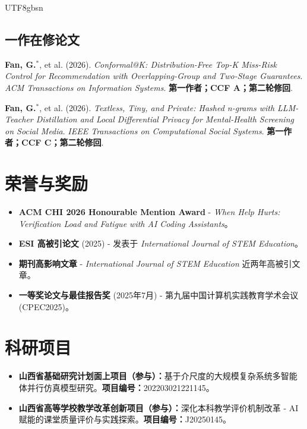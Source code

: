 \documentclass[a4paper,10pt]{article}
\newcommand{\cvlabel}[1]{\textbf{#1}}
\newcommand{\pubitem}[1]{\item #1}
\begin{document}
\begin{CJK*}{UTF8}{gbsn}
\subsection*{一作在修论文}
\begin{enumerate}[label=\textbf{[R\arabic*]}]
  \pubitem{\textbf{Fan, G.}$^{*}$, et al. (2026). \textit{Conformal@K: Distribution-Free Top-K Miss-Risk Control for Recommendation with Overlapping-Group and Two-Stage Guarantees}. \textit{ACM Transactions on Information Systems}. \textbf{第一作者；CCF A；第二轮修回}. }

  \pubitem{\textbf{Fan, G.}$^{*}$, et al. (2026). \textit{Textless, Tiny, and Private: Hashed n-grams with LLM-Teacher Distillation and Local Differential Privacy for Mental-Health Screening on Social Media}. \textit{IEEE Transactions on Computational Social Systems}. \textbf{第一作者；CCF C；第二轮修回}. }
\end{enumerate}

\section*{荣誉与奖励}
\begin{itemize}
  \item \textbf{ACM CHI 2026 Honourable Mention Award} - \textit{When Help Hurts: Verification Load and Fatigue with AI Coding Assistants}。
  \item \textbf{ESI 高被引论文} (2025) - 发表于 \textit{International Journal of STEM Education}。
  \item \textbf{期刊高影响文章} - \textit{International Journal of STEM Education} 近两年高被引文章。
  \item \textbf{一等奖论文与最佳报告奖} (2025年7月) - 第九届中国计算机实践教育学术会议 (CPEC2025)。
\end{itemize}

\section*{科研项目}
\begin{itemize}
  \item \cvlabel{山西省基础研究计划面上项目（参与）：}基于介尺度的大规模复杂系统多智能体并行仿真模型研究。\cvlabel{项目编号：}202203021221145。
  \item \cvlabel{山西省高等学校教学改革创新项目（参与）：}深化本科教学评价机制改革 - AI 赋能的课堂质量评价与实践探索。\cvlabel{项目编号：}J20250145。
\end{itemize}


\end{CJK*}
\end{document}
